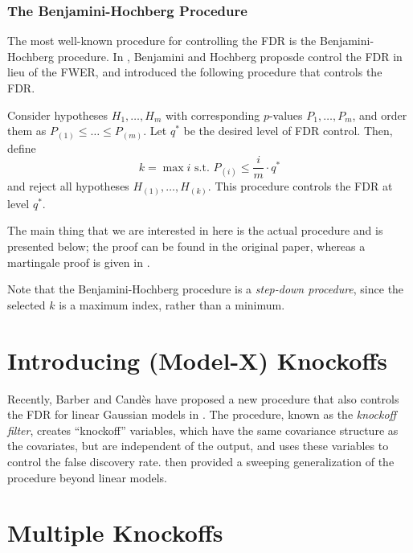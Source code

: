 \documentclass[11pt,reqno]{report}
\theoremstyle{definition}
\numberwithin{equation}{section}
\begin{document}
\subsection{The Benjamini-Hochberg Procedure}
The most well-known procedure for controlling the FDR is the Benjamini-Hochberg procedure. In \cite{bh}, Benjamini and Hochberg proposde control the FDR in lieu of the FWER, and introduced the following procedure that controls the FDR.
\begin{theorem}
Consider hypotheses $H_1, \ldots, H_m$ with corresponding $p$-values $P_1, \ldots, P_m$, and order them as $P_{(1)} \leq \ldots \leq P_{(m)}$. Let $q^*$ be the desired level of FDR control. Then, define
\[ k = \max i \text{ s.t. } P_{(i)} \leq \frac{i}{m} \cdot q^{*} \] and reject all hypotheses $H_{(1)}, \ldots, H_{(k)}$. This procedure controls the FDR at level $q^*$. 
\end{theorem}
The main thing that we are interested in here is the actual procedure and is presented below; the proof can be found in the original paper, whereas a martingale proof is given in \cite{stat300}.


Note that the Benjamini-Hochberg procedure is a \emph{step-down procedure}, since the selected $k$ is a maximum index, rather than a minimum. 


\chapter{Introducing (Model-X) Knockoffs}
\label{chapter2}
Recently, Barber and Cand\`{e}s have proposed a new procedure that also controls the FDR for linear Gaussian models in \cite{knockoffs}. The procedure, known as the \emph{knockoff filter}, creates ``knockoff'' variables, which have the same covariance structure as the covariates, but are independent of the output, and uses these variables to control the false discovery rate. \cite{panning} then provided a sweeping generalization of the procedure beyond linear models.


\chapter{Multiple Knockoffs}
\label{chapter3}
\end{document}
